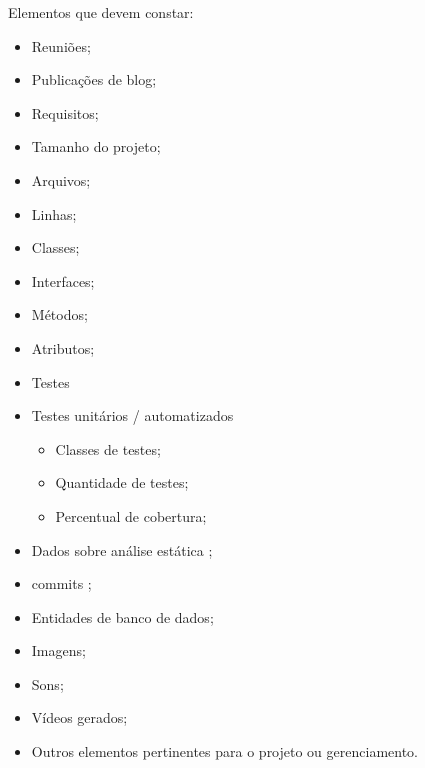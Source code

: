 Elementos que devem constar:
\begin{itemize}
    \item Reuniões;
    
    \item Publicações de blog;
    
    \item Requisitos;
    
    \item Tamanho do projeto;
    
    \item Arquivos;
    
    \item Linhas;

    \item Classes;
    
    \item Interfaces;
    
    \item Métodos;
    
    \item Atributos;
    
    \item Testes 
    
    \item Testes unitários / automatizados 
    \begin{itemize}
        \item Classes de testes;
        
        \item Quantidade de testes;
        
        \item Percentual de cobertura;
        
    \end{itemize}
    
    \item Dados sobre análise estática ;
    
    \item \glspl{commit} ;
    
    \item Entidades de banco de dados;
    
    \item Imagens;
    
    \item Sons;
    
    \item Vídeos gerados;
    
    \item Outros elementos pertinentes para o projeto ou gerenciamento.
\end{itemize}


